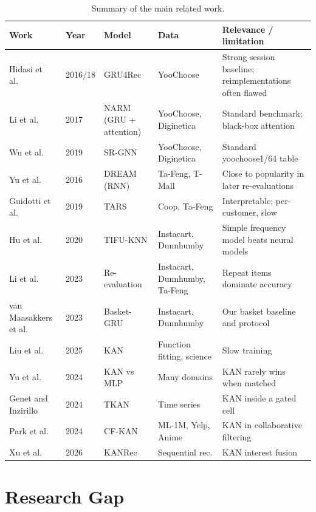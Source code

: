 \begin{table}[H]
\centering
\caption{Summary of the main related work.}
\label{tab:related}
\small
\begin{tabular}{L{3.2cm} L{1.3cm} L{2.7cm} L{2.5cm} L{3.9cm}}
\toprule
\textbf{Work} & \textbf{Year} & \textbf{Model} & \textbf{Data} & \textbf{Relevance / limitation} \\
\midrule
Hidasi et al.\ \cite{hidasi2016,hidasi2018} & 2016/18 & GRU4Rec & YooChoose & Strong session baseline; reimplementations often flawed \cite{hidasi2023} \\
Li et al.\ \cite{li2017} & 2017 & NARM (GRU + attention) & YooChoose, Diginetica & Standard benchmark; black-box attention \\
Wu et al.\ \cite{wu2019} & 2019 & SR-GNN & YooChoose, Diginetica & Standard yoochoose1/64 table \\
Yu et al.\ \cite{yu2016} & 2016 & DREAM (RNN) & Ta-Feng, T-Mall & Close to popularity in later re-evaluations \cite{li2023} \\
Guidotti et al.\ \cite{guidotti2019} & 2019 & TARS & Coop, Ta-Feng & Interpretable; per-customer, slow \\
Hu et al.\ \cite{hu2020} & 2020 & TIFU-KNN & Instacart, Dunnhumby & Simple frequency model beats neural models \\
Li et al.\ \cite{li2023} & 2023 & Re-evaluation & Instacart, Dunnhumby, Ta-Feng & Repeat items dominate accuracy \\
van Maasakkers et al.\ \cite{vanmaasakkers2023} & 2023 & Basket-GRU & Instacart, Dunnhumby & Our basket baseline and protocol \\
Liu et al.\ \cite{liu2025kan} & 2025 & KAN & Function fitting, science & Slow training \\
Yu et al.\ \cite{yu2024} & 2024 & KAN vs MLP & Many domains & KAN rarely wins when matched \\
Genet and Inzirillo \cite{genet2024} & 2024 & TKAN & Time series & KAN inside a gated cell \\
Park et al.\ \cite{park2024cfkan} & 2024 & CF-KAN & ML-1M, Yelp, Anime & KAN in collaborative filtering \\
Xu et al.\ \cite{xu2026kanrec} & 2026 & KANRec & Sequential rec. & KAN interest fusion \\
\bottomrule
\end{tabular}
\end{table}

\section{Research Gap}

